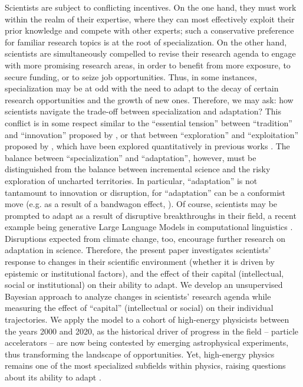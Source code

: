 \documentclass{article}
\begin{document}
Scientists are subject to conflicting incentives. On the one hand, they must work within the realm of their expertise, where they can most effectively exploit their prior knowledge and compete with other experts; such a conservative preference for familiar research topics is at the root of specialization. On the other hand, scientists are simultaneously compelled to revise their research agenda to engage with more promising research areas, in order to benefit from more exposure, to secure funding, or to seize job opportunities. Thus, in some instances, specialization may be at odd with the need to adapt to the decay of certain research opportunities and the growth of new ones. Therefore, we may ask: how scientists navigate the trade-off between specialization and adaptation? This conflict is in some respect similar to the ``essential tension'' between ``tradition'' and ``innovation'' proposed by \citet{Kuhn1997}, or that between ``exploration'' and ``exploitation'' proposed by \citet{March1991}, which have been explored quantitatively in previous works \citep{Foster2015,Jia2017,Aleta2019,Zeng2019,Tripodi2020,Chakresh2023,Feifan2023}%
. The balance between ``specialization'' and ``adaptation'', however, must be distinguished from the balance between incremental science and the risky exploration of uncharted territories. In particular, ``adaptation'' is not tantamount to innovation or disruption, for ``adaptation'' can be a conformist move (e.g. as a result of a bandwagon effect, \citealt{Fujimura1988}). Of course, scientists may be prompted to adapt as a result of disruptive breakthroughs in their field, a recent example being generative Large Language Models in computational linguistics \citep{Naomi2023}. Disruptions expected from climate change, too, encourage further research on adaptation in science. Therefore, the present paper investigates scientists' response to changes in their scientific environment (whether it is driven by epistemic or institutional factors), and the effect of their capital (intellectual, social or institutional) on their ability to adapt. We develop an unsupervised Bayesian approach to analyze changes in scientists' research agenda while measuring the effect of ``capital'' (intellectual or social) on their individual trajectories. We apply the model to a cohort of high-energy physicists between the years 2000 and 2020, as the historical driver of progress in the field -- particle accelerators -- are now being contested by emerging astrophysical experiments, thus transforming the landscape of opportunities. Yet, high-energy physics remains one of the most specialized subfields within physics, raising questions about its ability to adapt \citep{Battiston2019,Aleta2019}.
\end{document}
